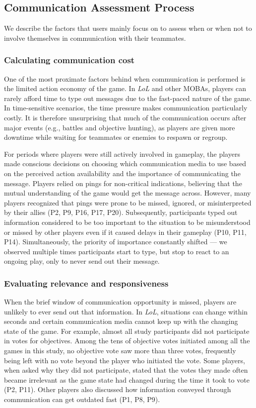 \subsection{Communication Assessment Process}

We describe the factors that users mainly focus on to assess when or when not to involve themselves in communication with their teammates. 

\subsubsection{Calculating communication cost}
One of the most proximate factors behind when communication is performed is the limited action economy of the game. In \textit{LoL} and other MOBAs, players can rarely afford time to type out messages due to the fast-paced nature of the game. In time-sensitive scenarios, the time pressure makes communication particularly costly. It is therefore unsurprising that much of the communication occurs after major events (e.g., battles and objective hunting), as players are given more downtime while waiting for teammates or enemies to respawn or regroup.

For periods where players were still actively involved in gameplay, the players made conscious decisions on choosing which communication media to use based on the perceived action availability and the importance of communicating the message. Players relied on pings for non-critical indications, believing that the mutual understanding of the game would get the message across. However, many players recognized that pings were prone to be missed, ignored, or misinterpreted by their allies (P2, P9, P16, P17, P20). Subsequently, participants typed out information considered to be too important to the situation to be misunderstood or missed by other players even if it caused delays in their gameplay (P10, P11, P14). Simultaneously, the priority of importance constantly shifted --- we observed multiple times participants start to type, but stop to react to an ongoing play, only to never send out their message.

\subsubsection{Evaluating relevance and responsiveness}
When the brief window of communication opportunity is missed, players are unlikely to ever send out that information. In \textit{LoL}, situations can change within seconds and certain communication media cannot keep up with the changing state of the game. For example, almost all study participants did not participate in votes for objectives. Among the tens of objective votes initiated among all the games in this study, no objective vote saw more than three votes, frequently being left with no vote beyond the player who initiated the vote. Some players, when asked why they did not participate, stated that the votes they made often became irrelevant as the game state had changed during the time it took to vote (P2, P11). Other players also discussed how information conveyed through communication can get outdated fast (P1, P8, P9). 

